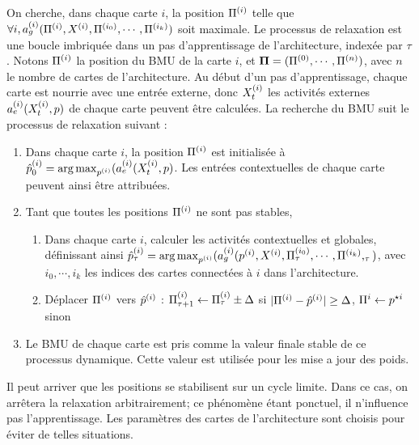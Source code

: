 On cherche, dans chaque carte $i$, la position $\Pi^{({i})}$ telle que $\forall i, a_g^{({i})}(\Pi^{({i})},X^{({i})},\Pi^{({i_0})},\cdots,\Pi^{({i_k})})$ soit maximale.
Le processus de relaxation est une boucle imbriquée dans un pas d'apprentissage de l'architecture, indexée par $\tau$. Notons $\Pi^{({i})}$ la position du BMU de la carte $i$, et $\mathbf{\Pi} = (\Pi^{({0})}, \cdots , \Pi^{({n})})$, avec $n$ le nombre de cartes de l'architecture.
Au début d'un pas d'apprentissage, chaque carte est nourrie avec une entrée externe, donc $X^{({i})}_t$ les activités externes $a_e^{({i})}(X^{({i})}_t,p)$ de chaque carte peuvent être calculées.
La recherche du BMU suit le processus de relaxation suivant :
\begin{enumerate}
\item Dans chaque carte $i$, la position $\Pi^{({i})}$ est initialisée à $\hat{p}^{({i})}_0 = \operatorname*{arg\,max}_{p^{({i})}}(a_e^{({i})}(X^{({i})}_t,p)$. Les entrées contextuelles de chaque carte peuvent ainsi être attribuées.
\item Tant que toutes les positions $\Pi^{({i})}$ ne sont pas stables, 
	\begin{enumerate}
	\item Dans chaque carte $i$, calculer les activités contextuelles et globales, définissant ainsi $\hat{p}^{({i})}_\tau = \operatorname*{arg\,max}_{p^{({i})}}(a_g^{({i})}(p^{({i})},X^{({i})}, \Pi^{({i_0})}_\tau,\cdots,\Pi^{({i_k})},_\tau)$, avec $i_0, \cdots, i_k$ les indices des cartes connectées à $i$ dans l'architecture.
	\item Déplacer $\Pi^{({i})}$ vers $\hat{p}^{({i})}$ : $\Pi^{({i})}_{\tau +1} \leftarrow \Pi^{({i})}_\tau \pm \Delta$ si $\lvert \Pi^{({i})}- \hat{p}^{({i})}\rvert \geq \Delta$, $\Pi^i \leftarrow p^{\star i}$ sinon
	\end{enumerate}
\item Le BMU de chaque carte est pris comme la valeur finale stable de ce processus dynamique. Cette valeur est utilisée pour les mise a jour des poids.
\end{enumerate}

Il peut arriver que les positions se stabilisent sur un cycle limite. Dans ce cas, on arrêtera la relaxation arbitrairement; ce phénomène étant ponctuel, il n'influence pas l'apprentissage. Les paramètres des cartes de l'architecture sont choisis pour éviter de telles situations.

